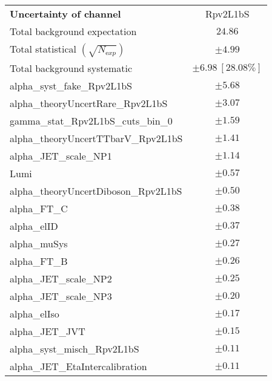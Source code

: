 
\begin{table}
\begin{center}
\setlength{\tabcolsep}{0.0pc}
\begin{tabular*}{\textwidth}{@{\extracolsep{\fill}}lc}
\noalign{\smallskip}\hline\noalign{\smallskip}
{\bfseries Uncertainty of channel}                                    & Rpv2L1bS            \\
\noalign{\smallskip}\hline\noalign{\smallskip}
Total background expectation             &  $24.86$       \\
\noalign{\smallskip}\hline\noalign{\smallskip}
Total statistical $(\sqrt{N_{\mathrm exp}})$              & $\pm 4.99$       \\
Total background systematic               & $\pm 6.98\ [28.08\%] $             \\
\noalign{\smallskip}\hline\noalign{\smallskip}
\noalign{\smallskip}\hline\noalign{\smallskip}
alpha\_syst\_fake\_Rpv2L1bS         & $\pm 5.68$       \\
alpha\_theoryUncertRare\_Rpv2L1bS         & $\pm 3.07$       \\
gamma\_stat\_Rpv2L1bS\_cuts\_bin\_0         & $\pm 1.59$       \\
alpha\_theoryUncertTTbarV\_Rpv2L1bS         & $\pm 1.41$       \\
alpha\_JET\_scale\_NP1         & $\pm 1.14$       \\
Lumi         & $\pm 0.57$       \\
alpha\_theoryUncertDiboson\_Rpv2L1bS         & $\pm 0.50$       \\
alpha\_FT\_C         & $\pm 0.38$       \\
alpha\_elID         & $\pm 0.37$       \\
alpha\_muSys         & $\pm 0.27$       \\
alpha\_FT\_B         & $\pm 0.26$       \\
alpha\_JET\_scale\_NP2         & $\pm 0.25$       \\
alpha\_JET\_scale\_NP3         & $\pm 0.20$       \\
alpha\_elIso         & $\pm 0.17$       \\
alpha\_JET\_JVT         & $\pm 0.15$       \\
alpha\_syst\_misch\_Rpv2L1bS         & $\pm 0.11$       \\
alpha\_JET\_EtaIntercalibration         & $\pm 0.11$       \\

\end{tabular*}
\end{center}
\end{table}
